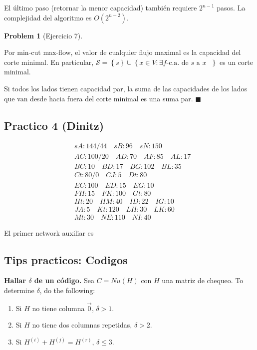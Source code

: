 \documentclass[a4paper]{article}
\newtheorem{problem}{Problem}
\newtheorem{problem}{Problem}
\begin{document}
El último paso (retornar la menor capacidad) también requiere $2^{n-1}$ pasos.
La complejidad del algoritmo es $O(2^{n-2})$.

\begin{problem}[Ejercicio 7]
    
\end{problem}

Por min-cut max-flow, el valor de cualquier flujo maximal es la capacidad del
corte minimal. En particular, $\mathcal{S} = \left\{ s \right\} \cup  \left\{ x
\in V : \exists f\text{-c.a.} \text{ de $s$ a $x$ }\right\} $ es un corte
minimal.

Si todos los lados tienen capacidad par, la suma de las
capacidades de los lados que van desde hacia fuera del corte minimal es una suma
par. $\blacksquare$

\pagebreak 

\subsection{Practico 4 (Dinitz)}

\begin{align*}
&sA: 144/44 \quad sB: 96 \quad sN: 150 \\ 
&AC: 100 / 20 \quad AD: 70 \quad AF: 85 \quad AL: 17\\
&BC: 10 \quad BD :17 \quad BG :102 \quad BL: 35 \\
&Ct: 80/0 \quad CJ :5 \quad Dt: 80\\
&EC: 100 \quad ED: 15 \quad EG: 10\\
&FH: 15 \quad FK :100 \quad Gt: 80\\
&Ht: 20 \quad HM :40 \quad ID :22 \quad IG :10 \\
&JA: 5 \quad Kt :120 \quad LH :30 \quad LK :60 \\ 
&Mt: 30 \quad NE: 110 \quad NI: 40
\end{align*}


El primer network auxiliar es 


\subsection{Tips practicos: Codigos}

\textbf{Hallar $\delta$ de un código.} Sea $C = Nu(H)$ con $H$ una matriz de
chequeo. To determine $\delta$, do the following: 

\begin{enumerate}
    \item Si $H$ no tiene columna $\overrightarrow{0}$, $\delta > 1$.
    \item Si $H$ no tiene dos columnas repetidas, $\delta > 2$.
    \item Si $H^{(i)} + H^{(j)} = H^{(r)}$, $\delta \leq 3$.
\end{enumerate}
\end{document}
